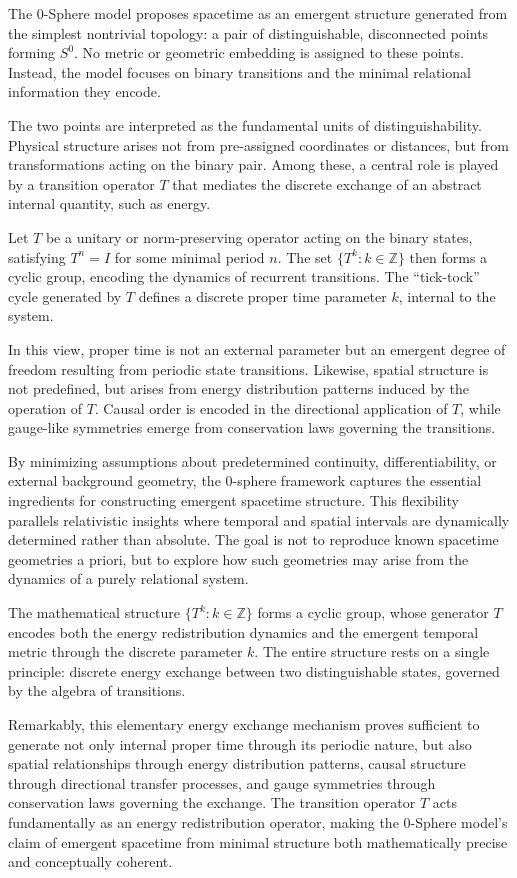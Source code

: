 \documentclass[%
 reprint,
 amsmath,amssymb,
 aps,
]{revtex4-1}
\numberwithin{equation}{section}%
\begin{document}
The 0-Sphere model proposes spacetime as an emergent structure generated from the simplest nontrivial topology: a pair of distinguishable, disconnected points forming $S^0$. No metric or geometric embedding is assigned to these points. Instead, the model focuses on binary transitions and the minimal relational information they encode.

The two points are interpreted as the fundamental units of distinguishability. Physical structure arises not from pre-assigned coordinates or distances, but from transformations acting on the binary pair. Among these, a central role is played by a transition operator $T$ that mediates the discrete exchange of an abstract internal quantity, such as energy.

Let $T$ be a unitary or norm-preserving operator acting on the binary states, satisfying $T^n = I$ for some minimal period $n$. The set $\{T^k : k \in \mathbb{Z}\}$ then forms a cyclic group, encoding the dynamics of recurrent transitions. The ``tick-tock'' cycle generated by $T$ defines a discrete proper time parameter $k$, internal to the system.

In this view, proper time is not an external parameter but an emergent degree of freedom resulting from periodic state transitions. Likewise, spatial structure is not predefined, but arises from energy distribution patterns induced by the operation of $T$. Causal order is encoded in the directional application of $T$, while gauge-like symmetries emerge from conservation laws governing the transitions.

By minimizing assumptions about predetermined continuity, differentiability, or external background geometry, the 0-sphere framework captures the essential ingredients for constructing emergent spacetime structure. This flexibility parallels relativistic insights where temporal and spatial intervals are dynamically determined rather than absolute. The goal is not to reproduce known spacetime geometries a priori, but to explore how such geometries may arise from the dynamics of a purely relational system.

The mathematical structure $\{T^k : k \in \mathbb{Z}\}$ forms a cyclic group, whose generator $T$ encodes both the energy redistribution dynamics and the emergent temporal metric through the discrete parameter $k$. The entire structure rests on a single principle: discrete energy exchange between two distinguishable states, governed by the algebra of transitions.

Remarkably, this elementary energy exchange mechanism proves sufficient to generate not only internal proper time through its periodic nature, but also spatial relationships through energy distribution patterns, causal structure through directional transfer processes, and gauge symmetries through conservation laws governing the exchange. The transition operator $T$ acts fundamentally as an energy redistribution operator, making the 0-Sphere model's claim of emergent spacetime from minimal structure both mathematically precise and conceptually coherent.
\end{document}
